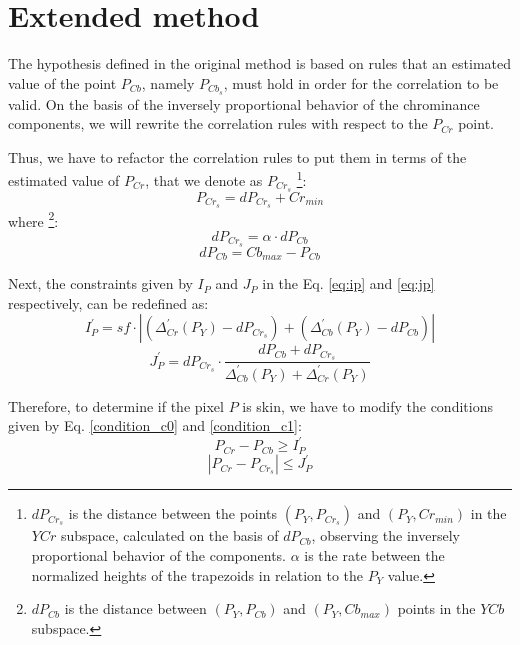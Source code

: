 \section{Extended method}
\label{sec:proposed_method}
The hypothesis defined in the original method is based on rules that an estimated value of the point $P_{Cb}$, namely $P_{Cb_s}$, must hold in order for the correlation to be valid. On the basis of the inversely proportional behavior of the chrominance components, we will rewrite the correlation rules with respect to the $P_{Cr}$ point.

Thus, we have to refactor the correlation rules to put them in terms of the estimated value of $P_{Cr}$, that we denote as $P_{Cr_s}$ \footnote{$dP_{Cr_s}$ is the distance between the points $(P_Y, P_{Cr_s})$ and $(P_Y, Cr_{min})$ in the $YCr$ subspace, calculated on the basis of $dP_{Cb}$, observing the inversely proportional behavior of the components. $\alpha$ is the rate between the normalized heights of the trapezoids in relation to the $P_Y$ value.}:
\begin{equation}
    P_{Cr_s} = dP_{Cr_s} + Cr_{min}
\end{equation}
where \footnote{$dP_{Cb}$ is the distance between $(P_Y, P_{Cb})$ and $(P_Y, Cb_{max})$ points in the $YCb$ subspace.}:
\begin{equation}
    dP_{Cr_s} = \alpha \cdot dP_{Cb}
\end{equation}
\begin{equation}
    dP_{Cb}   = Cb_{max} - P_{Cb}
\end{equation}

Next, the constraints given by $I_P$ and $J_P$ in the Eq. \ref{eq:ip} and \ref{eq:jp} respectively, can be redefined as:
\begin{equation}
    I^{'}_P = sf \cdot |(\Delta^{'}_{Cr}(P_Y) - dP_{Cr_s}) + (\Delta^{'}_{Cb}(P_Y) - dP_{Cb})|
\end{equation}
\begin{equation}
    J^{'}_P = dP_{Cr_s} \cdot \frac{dP_{Cb} + dP_{Cr_s}} {\Delta^{'}_{Cb}(P_Y) + \Delta^{'}_{Cr}(P_Y)}
\end{equation}

Therefore, to determine if the pixel $P$ is skin, we have to modify the conditions given by Eq. \ref{condition_c0} and \ref{condition_c1}:
\begin{equation}
    P_{Cr} - P_{Cb} \geq I^{'}_P
\label{condition_c00}
\end{equation}
\begin{equation}
   |P_{Cr} - P_{Cr_s}| \leq J^{'}_P
\label{condition_c11}
\end{equation}

